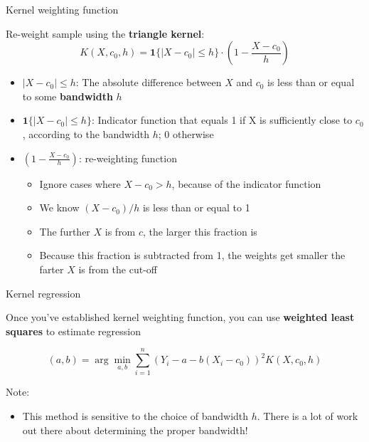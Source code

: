 \begin{frame}{Kernel weighting function}

Re-weight sample using the \textbf{triangle kernel}:
\begin{equation*}
    K (X, c_0, h) = \mathbf{1} \{ \vert X - c_0 \vert \leq h\} \cdot \left( 1 - \frac{X - c_0}{h} \right)
\end{equation*}
\begin{itemize}
    \item $\vert X - c_0 \vert \leq h$: The absolute difference between $X$ and $c_0$ is less than or equal to some \textbf{bandwidth} $h$
    \item $\mathbf{1} \{ \vert X - c_0 \vert \leq h\}$: Indicator function that equals 1 if X is sufficiently close to $c_0$, according to the bandwidth $h$; 0 otherwise
    \item $\left( 1 - \frac{X - c_0}{h} \right)$: re-weighting function
    \begin{itemize}
        \item Ignore cases where $X - c_0 > h$, because of the indicator function
        \item We know $(X - c_0) / h$ is less than or equal to 1
        \item The further $X$ is from $c$, the larger this fraction is
        \item Because this fraction is subtracted from 1, the weights get smaller the farter $X$ is from the cut-off
    \end{itemize}
\end{itemize}



\end{frame}


\begin{frame}{Kernel regression}

Once you've established kernel weighting function, you can use \textbf{weighted least squares} to estimate regression

\begin{equation*}
    (a, b) = \arg \min_{a, b} \sum_{i=1}^n \left(Y_i - a - b (X_i - c_0) \right)^2 K (X, c_0, h)
\end{equation*}

Note: 
\begin{itemize}
    \item This method is sensitive to the choice of bandwidth $h$. There is a lot of work out there about determining the proper bandwidth!
\end{itemize}


\end{frame}

